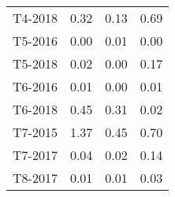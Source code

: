 \begin{tabular}{lrrr}
     T4-2018 &                     0.32 &                    0.13 &                      0.69 \\
     T5-2016 &                     0.00 &                    0.01 &                      0.00 \\
     T5-2018 &                     0.02 &                    0.00 &                      0.17 \\
     T6-2016 &                     0.01 &                    0.00 &                      0.01 \\
     T6-2018 &                     0.45 &                    0.31 &                      0.02 \\
     T7-2015 &                     1.37 &                    0.45 &                      0.70 \\
     T7-2017 &                     0.04 &                    0.02 &                      0.14 \\
     T8-2017 &                     0.01 &                    0.01 &                      0.03 \\
\bottomrule
\end{tabular}

